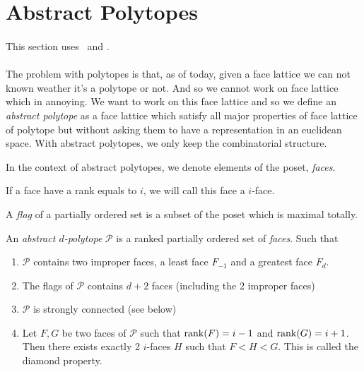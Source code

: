 \section{Abstract Polytopes}

\paragraph{}
This section uses~\cite{incidenceGeometry} and \cite{abstractRegularPolytopes}.

\paragraph{}
The problem with polytopes is that, as of today, given a face lattice we can not known weather it's a polytope or not. And so we cannot work on face lattice which in annoying. We want to work on this face lattice and so we define an \textit{abstract polytope} as a face lattice which satisfy all major properties of face lattice of polytope but without asking them to have a representation in an euclidean space. With abstract polytopes, we only keep the combinatorial structure.



\begin{definition}
  In the context of abstract polytopes, we denote elements of the poset, \textit{faces}.
\end{definition}

\begin{definition}[$i$-face]
  If a face have a rank equals to $i$, we will call this face a $i$-face.
\end{definition}

\begin{definition}
  A \textit{flag} of a partially ordered set is a subset of the poset which is maximal totally.
\end{definition}

\begin{definition}
  An \textit{abstract $d$-polytope} $\mathcal P$ is a ranked partially ordered set of \textit{faces}. Such that
  \begin{enumerate}
    \item $\mathcal P$ contains two improper faces, a least face $F_{-1}$ and a greatest face $F_d$.
    \item The flags of $\mathcal P$ contains $d + 2$ faces (including the 2 improper faces)
    \item $\mathcal P$ is strongly connected (see below)
    \item Let $F, G$ be two faces of $\mathcal P$ such that $\operatorname{rank}(F) = i - 1$ and $\operatorname{rank}(G) = i + 1$. Then there exists exactly 2 $i$-faces $H$ such that $F < H < G$. This is called the diamond property.
  \end{enumerate}
\end{definition}

